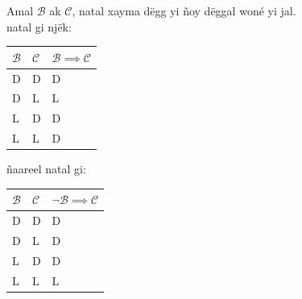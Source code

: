 \documentclass[twoside, a4paper]{article}
\begin{document}
\begin{tcolorbox}[enhanced jigsaw,breakable,pad at break*=1mm, colback=orange!5!white,colframe=white!75!black,title= Seetlu,
    watermark color=white]
  Amal $\mathcal{B}$ ak $\mathcal{C}$, natal xayma dëgg yi ñoy dëggal woné yi jal.\\

  natal gi njëk:\\

  \begin{tabularx}{0.8\textwidth} {
      | >{\centering\arraybackslash}X
      | >{\centering\arraybackslash}X
      | >{\centering\arraybackslash}X |}
    \hline
    $\mathcal{B}$ & $\mathcal{C}$ & $\mathcal{B}\implies\mathcal{C}$ \\
    \hline
    D             & D             & D                                \\
    D             & L             & L                                \\
    L             & D             & D                                \\
    L             & L             & D                                \\
    \hline
  \end{tabularx}
  \vspace{0.3cm}

  ñaareel natal gi:

  \vspace{0.3cm}
  \begin{tabularx}{0.8\textwidth} {
      | >{\centering\arraybackslash}X
      | >{\centering\arraybackslash}X
      | >{\centering\arraybackslash}X |}
    \hline
    $\mathcal{B}$ & $\mathcal{C}$ & $\neg\mathcal{B}\implies\mathcal{C}$ \\
    \hline
    D             & D             & D                                    \\
    D             & L             & D                                    \\
    L             & D             & D                                    \\
    L             & L             & L                                    \\
    \hline
  \end{tabularx}


\end{tcolorbox}
\end{document}
